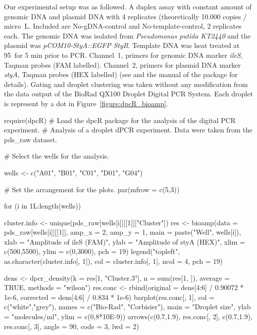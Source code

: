 Our experimental setup was as followed. A duplex assay with constant amount of 
genomic DNA and plasmid DNA with 4 replicates (theoretically 10.000 copies / 
micro~L. Included are No-gDNA-control and No-template-control, 2 replicates 
each. The genomic DNA was isolated from \textit{Pseudomonas putida KT2440} and 
the plasmid was \textit{pCOM10-StyA::EGFP StyB}. Template DNA was heat treated 
at 95\textcelsius~for 5 min prior to PCR. Channel~1, primers for genomic DNA 
marker \textit{ileS}, Taqman probes (FAM labelled). Channel~2, primers for 
plasmid DNA marker \textit{styA}, Taqman probes (HEX labelled) (see 
\citep{jahn_2013, jahn_2014} and the manual of the  package for 
details). Gating and droplet clustering was taken without any modification from 
the data output of the BioRad QX100 Droplet  Digital PCR System. Each droplet is 
represent by a dot in Figure~\ref{figure:dpcR_bioamp}.

\begin{example}
require(dpcR)
# Load the dpcR package for the analysis of the digital PCR experiment.
# Analysis of a droplet dPCR experiment. Data were taken from the pds_raw dataset.

# Select the wells for the analysis.

wells <- c("A01", "B01", "C01", "D01", "G04")

# Set the arrangement for the plots.
par(mfrow = c(5,3))

for (i in 1L:length(wells)) {
  cluster.info <- unique(pds_raw[wells[i]][[1]]["Cluster"])
  res <- bioamp(data = pds_raw[wells[i]][[1]], amp_x = 2, amp_y = 1, 
		main = paste("Well", wells[i]), xlab = "Amplitude of ileS (FAM)",
		ylab = "Amplitude of styA (HEX)", xlim = c(500,5500), 
		ylim = c(0,3000), pch = 19)
  legend("topleft", as.character(cluster.info[, 1]), col = cluster.info[, 1], 
	 ncol = 4, pch = 19)
  
  dens <- dpcr_density(k = res[1, "Cluster.3"], n = sum(res[1, ]), 
			average = TRUE, methods = "wilson")  
  res.conc <- rbind(original = dens[4:6] /  0.90072 * 1e-6, 
		    corrected = dens[4:6] / 0.834 * 1e-6)
  barplot(res.conc[, 1], col = c("white","grey"), 
	  names = c("Bio-Rad", "Corbisier"), 
	  main = "Droplet size", ylab = "molecules/ml", ylim = c(0,8*10E-9))
    arrows(c(0.7,1.9), res.conc[, 2], c(0.7,1.9), res.conc[, 3], angle = 90, 
	   code = 3, lwd = 2)
}
\end{example}

